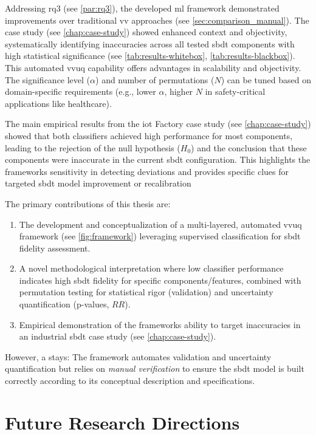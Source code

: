 Addressing \gls{rq}3 (see \autoref{par:rq3}), the developed \gls{ml} framework demonstrated improvements over traditional \gls{vv} approaches (see \autoref{sec:comparison_manual}). The case study (see \autoref{chap:case-study}) showed enhanced context and objectivity, systematically identifying inaccuracies across all tested \gls{sbdt} components with high statistical significance (see \autoref{tab:results-whitebox}, \autoref{tab:results-blackbox}). This automated \gls{vvuq} capability offers advantages in scalability and objectivity. The significance level ($\alpha$) and number of permutations ($N$) can be tuned based on domain-specific requirements (e.g., lower $\alpha$, higher $N$ in safety-critical applications like healthcare).

The main empirical results from the \gls{iot} Factory case study (see \autoref{chap:case-study}) showed that both classifiers achieved high performance for most components, leading to the rejection of the null hypothesis ($H_0$) and the conclusion that these components were inaccurate in the current \gls{sbdt} configuration. This highlights the frameworks sensitivity in detecting deviations and provides specific clues for targeted \gls{sbdt} model improvement or recalibration

The primary contributions of this thesis are:
\begin{enumerate}
  \item The development and conceptualization of a multi-layered, automated \gls{vvuq} framework (see \autoref{fig:framework}) leveraging supervised classification for \gls{sbdt} fidelity assessment.
  \item A novel methodological interpretation where low classifier performance indicates high \gls{sbdt} fidelity for specific components/features, combined with permutation testing for statistical rigor (validation) and uncertainty quantification (p-values, $RR$).
  \item Empirical demonstration of the frameworks ability to target inaccuracies in an industrial \gls{sbdt} case study (see \autoref{chap:case-study}).
\end{enumerate}

However, a  stays: The framework automates validation and uncertainty quantification but relies on \textit{manual verification} to ensure the \gls{sbdt} model is built correctly according to its conceptual description and specifications.

\section{Future Research Directions}
\label{sec:conclusion_future_work}

